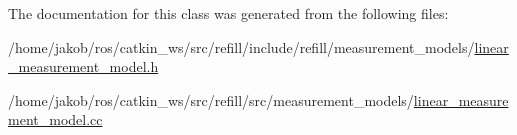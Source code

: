 The documentation for this class was generated from the following files\+:\begin{DoxyCompactItemize}
\item 
/home/jakob/ros/catkin\+\_\+ws/src/refill/include/refill/measurement\+\_\+models/\hyperlink{linear__measurement__model_8h}{linear\+\_\+measurement\+\_\+model.\+h}\item 
/home/jakob/ros/catkin\+\_\+ws/src/refill/src/measurement\+\_\+models/\hyperlink{linear__measurement__model_8cc}{linear\+\_\+measurement\+\_\+model.\+cc}\end{DoxyCompactItemize}
